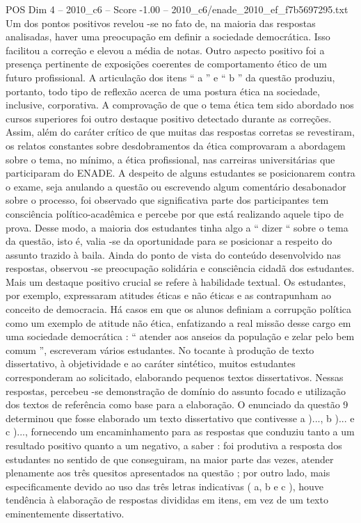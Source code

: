 \begin{textsample}{POS Dim 4 – 2010\_c6 – Score -1.00 – 2010\_c6/enade\_2010\_ef\_f7b5697295.txt}
Um dos pontos positivos revelou -se no fato de, na maioria das respostas analisadas, haver uma preocupação em definir a sociedade democrática.
Isso facilitou a correção e elevou a média de notas.
Outro aspecto positivo foi a presença pertinente de exposições coerentes de comportamento ético de um futuro profissional.
A articulação dos itens “ a ” e “ b ” da questão produziu, portanto, todo tipo de reflexão acerca de uma postura ética na sociedade, inclusive, corporativa.
A comprovação de que o tema ética tem sido abordado nos cursos superiores foi outro destaque positivo detectado durante as correções.
Assim, além do caráter crítico de que muitas das respostas corretas se revestiram, os relatos constantes sobre desdobramentos da ética comprovaram a abordagem sobre o tema, no mínimo, a ética profissional, nas carreiras universitárias que participaram do ENADE.
A despeito de alguns estudantes se posicionarem contra o exame, seja anulando a questão ou escrevendo algum comentário desabonador sobre o processo, foi observado que significativa parte dos participantes tem consciência político-acadêmica e percebe por que está realizando aquele tipo de prova.
Desse modo, a maioria dos estudantes tinha algo a “ dizer “ sobre o tema da questão, isto é, valia -se da oportunidade para se posicionar a respeito do assunto trazido à baila.
Ainda do ponto de vista do conteúdo desenvolvido nas respostas, observou -se preocupação solidária e consciência cidadã dos estudantes.
Mais um destaque positivo crucial se refere à habilidade textual.
Os estudantes, por exemplo, expressaram atitudes éticas e não éticas e as contrapunham ao conceito de democracia.
Há casos em que os alunos definiam a corrupção política como um exemplo de atitude não ética, enfatizando a real missão desse cargo em uma sociedade democrática : “ atender aos anseios da população e zelar pelo bem comum ”, escreveram vários estudantes.
No tocante à produção de texto dissertativo, à objetividade e ao caráter sintético, muitos estudantes corresponderam ao solicitado, elaborando pequenos textos dissertativos.
Nessas respostas, percebeu -se demonstração de domínio do assunto focado e utilização dos textos de referência como base para a elaboração.
O enunciado da questão 9 determinou que fosse elaborado um texto dissertativo que contivesse a )..., b )... e c )..., fornecendo um encaminhamento para as respostas que conduziu tanto a um resultado positivo quanto a um negativo, a saber : foi produtiva a resposta dos estudantes no sentido de que conseguiram, na maior parte das vezes, atender plenamente aos três quesitos apresentados na questão ; por outro lado, mais especificamente devido ao uso das três letras indicativas ( a, b e c ), houve tendência à elaboração de respostas divididas em itens, em vez de um texto eminentemente dissertativo.

\end{textsample}
